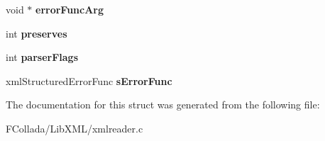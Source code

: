 \begin{DoxyCompactItemize}
\item 
\hypertarget{struct__xmlTextReader_a9e4275ccf7eb8746bd8b37037fda3fc4}{
void $\ast$ {\bfseries errorFuncArg}}
\label{struct__xmlTextReader_a9e4275ccf7eb8746bd8b37037fda3fc4}

\item 
\hypertarget{struct__xmlTextReader_aad9bd9efcbdf69643558b3f2c3771d14}{
int {\bfseries preserves}}
\label{struct__xmlTextReader_aad9bd9efcbdf69643558b3f2c3771d14}

\item 
\hypertarget{struct__xmlTextReader_a6514b5395cabebf39f19cd8161329fc7}{
int {\bfseries parserFlags}}
\label{struct__xmlTextReader_a6514b5395cabebf39f19cd8161329fc7}

\item 
\hypertarget{struct__xmlTextReader_ae085257abb1253e681710c6ebebaebb6}{
xmlStructuredErrorFunc {\bfseries sErrorFunc}}
\label{struct__xmlTextReader_ae085257abb1253e681710c6ebebaebb6}

\end{DoxyCompactItemize}


The documentation for this struct was generated from the following file:\begin{DoxyCompactItemize}
\item 
FCollada/LibXML/xmlreader.c\end{DoxyCompactItemize}
